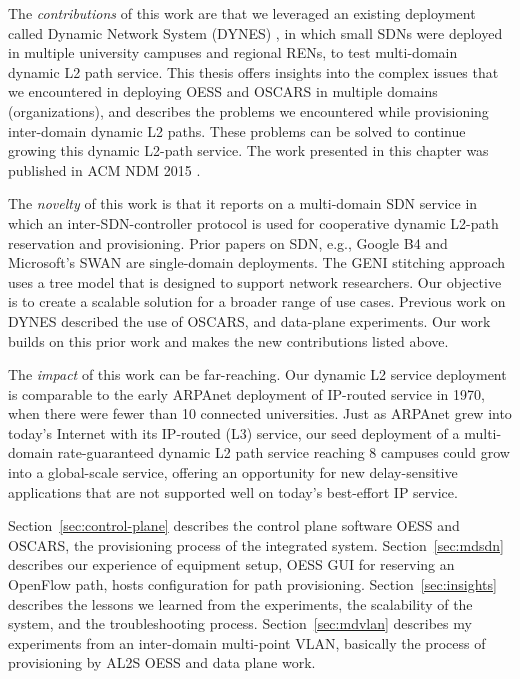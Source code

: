 The \emph{contributions} of this work are that we leveraged an existing deployment
called Dynamic Network System (DYNES) \cite{1742-6596-396-4-042065}, in which small SDNs were deployed
in multiple university campuses and regional RENs, to test multi-domain dynamic L2 path service. This thesis
offers insights into the complex issues that we encountered in deploying OESS and OSCARS in multiple domains (organizations), and describes the problems we encountered while provisioning inter-domain dynamic L2 paths. These problems can be solved to continue growing this dynamic L2-path service. The work presented in this chapter was
published in ACM NDM 2015 \cite{tepsuporn2015multi}.

The \emph{novelty} of this work is that it reports on a multi-domain SDN service in
which an inter-SDN-controller protocol is used for cooperative dynamic L2-path reservation and provisioning. Prior papers on SDN, e.g., Google B4  \cite{Jain:2013:BEG:2486001.2486019} and Microsoft's SWAN \cite{Hong:2013:AHU:2486001.2486012} are single-domain deployments. The GENI stitching approach
\cite{GENI-stitching} uses a tree model
that is designed to support network researchers. Our objective is to create
a scalable solution for a broader range of use cases.
Previous work on DYNES \cite{1742-6596-396-4-042065} described the use of OSCARS, and data-plane experiments. Our work builds on this prior work and makes the new contributions listed above.

The \emph{impact} of this work can be far-reaching. Our dynamic L2 service deployment is comparable to the early ARPAnet deployment of IP-routed service in 1970, when there were fewer than 10 connected universities. Just as ARPAnet grew into today's Internet with its IP-routed (L3) service, our seed deployment of a multi-domain rate-guaranteed dynamic L2 path service reaching 8 campuses could grow into a global-scale service, offering an opportunity for new delay-sensitive applications that are not supported well on today's best-effort IP service.

Section~\ref{sec:control-plane} describes the control plane software OESS and OSCARS, the provisioning process of the integrated system.
Section~\ref{sec:mdsdn} describes our experience of equipment setup, OESS GUI for reserving an OpenFlow path, hosts configuration for path provisioning.
Section~\ref{sec:insights} describes the lessons we learned from the experiments, the scalability of the system, and the troubleshooting process.
Section~\ref{sec:mdvlan} describes my experiments from an inter-domain multi-point VLAN, basically the process of provisioning by AL2S OESS and data plane work. 